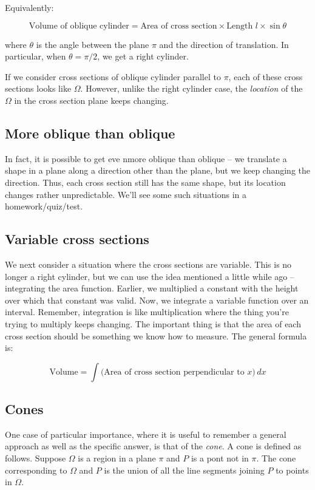 \documentclass[10pt]{amsart}
\begin{document}
Equivalently:

\begin{equation*}
  \text{Volume of oblique cylinder} = \text{Area of cross section} \times \text{Length $l$} \times \sin \theta
\end{equation*}

where $\theta$ is the angle between the plane $\pi$ and the direction
of translation. In particular, when $\theta = \pi/2$, we get a right
cylinder.

If we consider cross sections of oblique cylinder parallel to $\pi$,
each of these cross sections looks like $\Omega$. However, unlike the
right cylinder case, the {\em location} of the $\Omega$ in the cross
section plane keeps changing.

\subsection{More oblique than oblique}

In fact, it is possible to get eve nmore oblique than oblique -- we
translate a shape in a plane along a direction other than the plane,
but we keep changing the direction. Thus, each cross section still has
the same shape, but its location changes rather unpredictable. We'll
see some such situations in a homework/quiz/test.

\subsection{Variable cross sections}

We next consider a situation where the cross sections are
variable. This is no longer a right cylinder, but we can use the idea
mentioned a little while ago -- integrating the area
function. Earlier, we multiplied a constant with the height over which
that constant was valid. Now, we integrate a variable function over an
interval. Remember, integration is like multiplication where the thing
you're trying to multiply keeps changing. The important thing is that
the area of each cross section should be something we know how to
measure. The general formula is:

$$\text{Volume} = \int \text{(Area of cross section perpendicular to $x$)} \, dx$$

\subsection{Cones}

One case of particular importance, where it is useful to remember a
general approach as well as the specific answer, is that of the {\em
cone}. A cone is defined as follows. Suppose $\Omega$ is a region in a
plane $\pi$ and $P$ is a pont not in $\pi$. The cone corresponding to
$\Omega$ and $P$ is the union of all the line segments joining $P$ to
points in $\Omega$.
\end{document}
